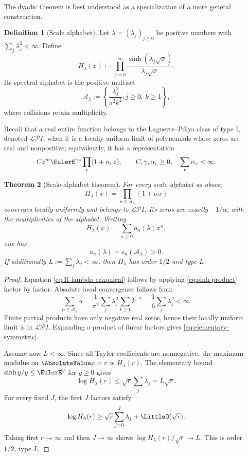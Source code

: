 \documentclass[11pt]{article}
\numberwithin{equation}{section}
\newtheorem{theorem}{Theorem}[section]
\theoremstyle{definition}
\newtheorem{definition}[theorem]{Definition}
\theoremstyle{remark}
\begin{document}
The dyadic theorem is best understood as a specialization of a more general construction.

\begin{definition}[Scale alphabet]
Let $\lambda=(\lambda_j)_{j\ge0}$ be positive numbers with
$\sum_j\lambda_j^2<\infty$.  Define
\begin{equation}\label{eq:H-lambda}
 H_\lambda(x):=\prod_{j=0}^{\infty}
 \frac{\sinh(\lambda_j\sqrt{x})}{\lambda_j\sqrt{x}}.
\end{equation}
Its spectral alphabet is the positive multiset
\begin{equation}\label{eq:alphabet}
 \mathcal A_\lambda:=
 \left\{\frac{\lambda_j^2}{\pi^2k^2}:j\ge0,\ k\ge1\right\},
\end{equation}
where collisions retain multiplicity.
\end{definition}

Recall that a real entire function belongs to the Laguerre--Pólya class of type I, denoted $\mathcal{LP}\!I$, when it is a locally uniform limit of polynomials whose zeros are real and nonpositive; equivalently, it has a representation
\[
 Cz^m\EulerE^{\gamma z}\prod_r(1+\alpha_r z),
 \qquad C,\gamma,\alpha_r\ge0,\quad\sum_r\alpha_r<\infty.
\]

\begin{theorem}[Scale-alphabet theorem]\label{thm:scale-alphabet}
For every scale alphabet as above,
\begin{equation}\label{eq:H-lambda-canonical}
 H_\lambda(x)=\prod_{\alpha\in\mathcal A_\lambda}(1+\alpha x)
\end{equation}
converges locally uniformly and belongs to $\mathcal{LP}\!I$.  Its zeros are exactly $-1/\alpha$, with the multiplicities of the alphabet.  Writing
\[
 H_\lambda(x)=\sum_{n\ge0}a_n(\lambda)x^n,
\]
one has
\begin{equation}\label{eq:elementary-symmetric}
 a_n(\lambda)=e_n(\mathcal A_\lambda)>0.
\end{equation}
If additionally $L:=\sum_j\lambda_j<\infty$, then $H_\lambda$ has order $1/2$ and type $L$.
\end{theorem}
\begin{proof}
Equation \eqref{eq:H-lambda-canonical} follows by applying \eqref{eq:sinh-product} factor by factor.  Absolute local convergence follows from
\[
 \sum_{\alpha\in\mathcal A_\lambda}\alpha
 =\frac{1}{\pi^2}\sum_j\lambda_j^2\sum_{k\ge1}k^{-2}
 =\frac16\sum_j\lambda_j^2<\infty.
\]
Finite partial products have only negative real zeros, hence their locally uniform limit is in $\mathcal{LP}\!I$.  Expanding a product of linear factors gives \eqref{eq:elementary-symmetric}.

Assume now $L<\infty$.  Since all Taylor coefficients are nonnegative, the maximum modulus on $\AbsoluteValue x=r$ is $H_\lambda(r)$.  The elementary bound $\sinh y/y\le\EulerE^y$ for $y\ge0$ gives
\[
 \log H_\lambda(r)\le\sqrt r\sum_j\lambda_j=L\sqrt r.
\]
For every fixed $J$, the first $J$ factors satisfy
\[
 \log H_\lambda(r)\ge\sqrt r\sum_{j=0}^{J}\lambda_j+\LittleO(\sqrt r).
\]
Taking first $r\to\infty$ and then $J\to\infty$ shows
$\log H_\lambda(r)/\sqrt r\to L$.  This is order $1/2$, type $L$.
\end{proof}
\end{document}
